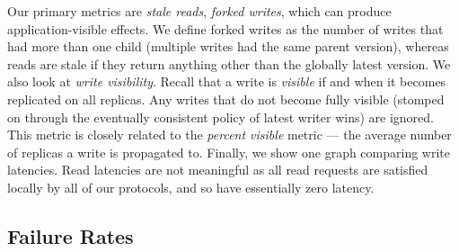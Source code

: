 \documentclass[10pt,conference,letterpaper]{IEEEtran}
\begin{document}
Our primary metrics are \textit{stale reads}, \textit{forked writes}, which can produce
application-visible effects.
We define forked writes as the number of writes that had more than one child (multiple
writes had the same parent version), whereas reads are stale if they return anything other
than the globally latest version.
We also look at \emph{write visibility}.
Recall that a write is \emph{visible} if and when it becomes replicated on all replicas.
Any writes that do not become fully visible (stomped on through the eventually consistent
policy of latest writer wins) are ignored.
This metric is closely related to the \textit{percent visible} metric --- the average
number of replicas a write is propagated to.
Finally, we show one graph comparing write latencies.
Read latencies are not meaningful as all read requests are satisfied locally by all of our
protocols, and so have essentially zero latency.

\subsection{Failure Rates}
\end{document}
